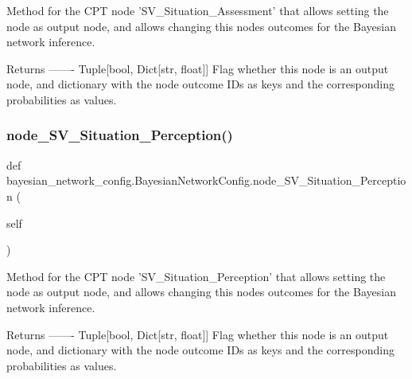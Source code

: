\begin{DoxyVerb}Method for the CPT node 'SV_Situation_Assessment' that allows setting the node as output node, 
and allows changing this nodes outcomes for the Bayesian network inference.

Returns
-------
Tuple[bool, Dict[str, float]]
    Flag whether this node is an output node, and dictionary with the node outcome IDs as keys 
    and the corresponding probabilities as values.
\end{DoxyVerb}
 \mbox{\label{classbayesian__network__config_1_1_bayesian_network_config_a1eb21f6bfb872d4c8773615d265c3727}} 
\subsubsection{\texorpdfstring{node\+\_\+\+S\+V\+\_\+\+Situation\+\_\+\+Perception()}{node\_SV\_Situation\_Perception()}\hspace{0.1cm}{\footnotesize\ttfamily [1/2]}}
{\footnotesize\ttfamily def bayesian\+\_\+network\+\_\+config.\+Bayesian\+Network\+Config.\+node\+\_\+\+S\+V\+\_\+\+Situation\+\_\+\+Perception (\begin{DoxyParamCaption}\item[{}]{self }\end{DoxyParamCaption})}

\begin{DoxyVerb}Method for the CPT node 'SV_Situation_Perception' that allows setting the node as output node,
and allows changing this nodes outcomes for the Bayesian network inference.

Returns
-------
Tuple[bool, Dict[str, float]]
    Flag whether this node is an output node, and dictionary with the node outcome IDs as keys
    and the corresponding probabilities as values.
\end{DoxyVerb}
 \mbox{\label{classbayesian__network__config_1_1_bayesian_network_config_a1eb21f6bfb872d4c8773615d265c3727}} 
